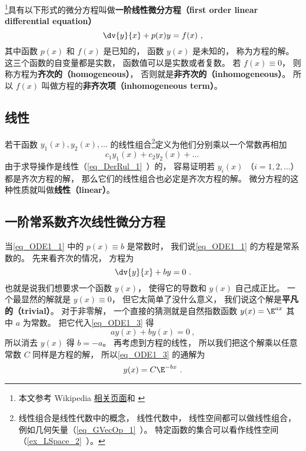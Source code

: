 
\begin{issues}
\issueNeedCite
{}
\end{issues}


\footnote{本文参考 Wikipedia \href{https://en.wikipedia.org/wiki/Ordinary_differential_equation}{相关页面}和 \cite{同济高}}具有以下形式的微分方程叫做\textbf{一阶线性微分方程（first order linear differential equation）}
\begin{equation}\label{eq_ODE1_1}
\dv{y}{x} + p(x)y = f(x)~,
\end{equation}
其中函数 $p(x)$ 和 $f(x)$ 是已知的， 函数 $y(x)$ 是未知的， 称为方程的解。 这三个函数的自变量都是实数， 函数值可以是实数或者复数。 若 $f(x) \equiv 0$， 则称方程为\textbf{齐次的（homogeneous）}， 否则就是\textbf{非齐次的（inhomogeneous）}。 所以 $f(x)$ 叫做方程的\textbf{非齐次项（inhomogeneous term）}。

\subsection{线性}
若干函数 $y_1(x), y_2(x), \dots$ 的线性组合\footnote{线性组合是线性代数中的概念， 线性代数中， 线性空间都可以做线性组合， 例如几何矢量（\autoref{eq_GVecOp_1}~）。 特定函数的集合可以看作线性空间（\autoref{ex_LSpace_2}~）。}定义为他们分别乘以一个常数再相加
\begin{equation}
c_1 y_1(x) + c_2 y_2(x) + \dots~
\end{equation}
由于求导操作是线性（\autoref{eq_DerRul_1}~）的， 容易证明若 $y_i(x)$ （$i = 1, 2,\dots$）都是齐次方程的解， 那么它们的线性组合也必定是齐次方程的解。 微分方程的这种性质就叫做\textbf{线性（linear）}。

\subsection{一阶常系数齐次线性微分方程}
当\autoref{eq_ODE1_1} 中的 $p(x) \equiv b$ 是常数时， 我们说\autoref{eq_ODE1_1} 的方程是常系数的。 先来看齐次的情况， 方程为
\begin{equation}\label{eq_ODE1_3}
\dv{y}{x} + by = 0~.
\end{equation}
也就是说我们想要求一个函数 $y(x)$， 使得它的导数和 $y(x)$ 自己成正比。 一个最显然的解就是 $y(x) \equiv 0$， 但它太简单了没什么意义， 我们说这个解是\textbf{平凡的（trivial）}。 对于非零解， 一个直接的猜测就是自然指数函数 $y(x) = \E^{ax}$ 其中 $a$ 为常数。 把它代入\autoref{eq_ODE1_3} 得
\begin{equation}
ay(x) + by(x) = 0~,
\end{equation}
所以消去 $y(x)$ 得 $b = -a$。 再考虑到方程的线性， 所以我们把这个解乘以任意常数 $C$ 同样是方程的解， 所以\autoref{eq_ODE1_3} 的通解为
\begin{equation}\label{eq_ODE1_5}
y(x) = C\E^{-bx}~.
\end{equation}

